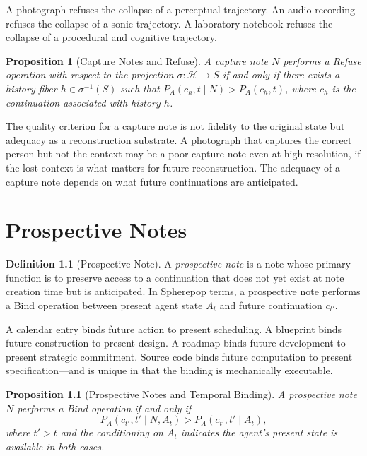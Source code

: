 \documentclass[12pt, a4paper, openany]{book}
\theoremstyle{plain}
\newtheorem{proposition}[theorem]{Proposition}
\theoremstyle{definition}
\newtheorem{definition}[theorem]{Definition}
\theoremstyle{remark}
\newcommand{\calH}{\mathcal{H}}
\begin{document}
A photograph refuses the collapse of a perceptual trajectory. An audio recording
refuses the collapse of a sonic trajectory. A laboratory notebook refuses the
collapse of a procedural and cognitive trajectory.

\begin{proposition}[Capture Notes and Refuse]
A capture note $N$ performs a Refuse operation with respect to the projection
$\sigma : \calH \to S$ if and only if there exists a history fiber
$h \in \sigma^{-1}(S)$ such that $P_A(c_h, t \mid N) > P_A(c_h, t)$, where
$c_h$ is the continuation associated with history $h$.
\end{proposition}

The quality criterion for a capture note is not fidelity to the original state
but adequacy as a reconstruction substrate. A photograph that captures the correct
person but not the context may be a poor capture note even at high resolution, if
the lost context is what matters for future reconstruction. The adequacy of a
capture note depends on what future continuations are anticipated.

\chapter{Prospective Notes}

\begin{definition}[Prospective Note]
A \emph{prospective note} is a note whose primary function is to preserve access
to a continuation that does not yet exist at note creation time but is anticipated.
In Spherepop terms, a prospective note performs a Bind operation between present
agent state $A_t$ and future continuation $c_{t'}$.
\end{definition}

A calendar entry binds future action to present scheduling. A blueprint binds
future construction to present design. A roadmap binds future development to
present strategic commitment. Source code binds future computation to present
specification---and is unique in that the binding is mechanically executable.

\begin{proposition}[Prospective Notes and Temporal Binding]
A prospective note $N$ performs a Bind operation if and only if
\[
P_A(c_{t'}, t' \mid N, A_t) > P_A(c_{t'}, t' \mid A_t),
\]
where $t' > t$ and the conditioning on $A_t$ indicates the agent's present state
is available in both cases.
\end{proposition}
\end{document}

